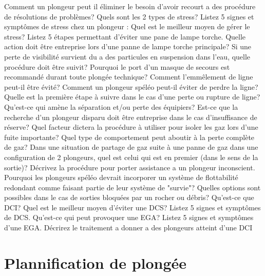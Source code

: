 \documentclass[english,10pt,a4paper]{article}
\begin{document}
	\begin{outline}
		\1 Comment un plongeur peut il éliminer le besoin d’avoir recourt a des procédure de résolutions de problèmes?
		\1 Quels sont les 2 types de stress?
		\1 Listez 5 signes et symptômes de stress chez un plongeur :
		\1 Quel est le meilleur moyen de gérer le stress?
		\1 Listez 5 étapes permettant d’éviter une pane de lampe torche.
		\1 Quelle action doit être entreprise lors d’une panne de lampe torche principale?
		\1 Si une perte de visibilité survient du a des particules en suspension dans l’eau, quelle procédure doit être suivit?
		\1 Pourquoi le port d’un masque de secours est recommandé durant toute plongée technique?
		\1 Comment l’emmêlement de ligne peut-il être évité?
		\1 Comment un plongeur spéléo peut-il éviter de perdre la ligne?
		\1 Quelle est la première étape à suivre dans le cas d’une perte ou rupture de ligne?
		\1 Qu’est-ce qui amène la séparation et/ou perte des équipiers?
		\1 Est-ce que la recherche d’un plongeur disparu doit être entreprise dans le cas d’insuffisance de réserve?
		\1 Quel facteur dictera la procédure à utiliser pour isoler les gaz lors d’une fuite importante?
		\1 Quel type de comportement peut aboutir à la perte complète de gaz?
		\1 Dans une situation de partage de gaz suite à une panne de gaz dans une configuration de 2 plongeurs, quel est celui qui est en premier (dans le sens de la sortie)?
		\1 Décrivez la procédure pour porter assistance a un plongeur inconscient.
		\1 Pourquoi les plongeurs spéléo devrait incorporer un système de flottabilité redondant comme faisant partie de leur système de "survie"?
		\1 Quelles options sont possibles dans le cas de sorties bloquées par un rocher ou débris?
		\1 Qu’est-ce que DCI?
		\1 Quel est le meilleur moyen d’éviter une DCS?
		\1 Listez 5 signes et symptômes de DCS.
		\1 Qu’est-ce qui peut provoquer une EGA?
		\1 Listez 5 signes et symptômes d’une EGA.
		\1 Décrirez le traitement a donner a des plongeurs atteint d’une DCI
	\end{outline}
	\sectionpage

	\section{Plannification de plongée}
\end{document}

